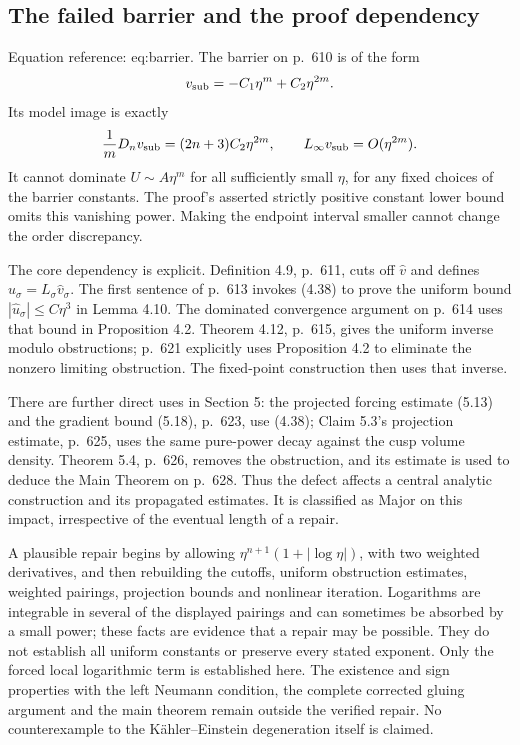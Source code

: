 \documentclass[10pt]{article}
\begin{document}
\subsection*{The failed barrier and the proof dependency}
Equation reference: eq:barrier. The barrier on p. 610 is of the form \[v_{\rm sub}=-C_1\eta^m+C_2\eta^{2m}.\] Its model image is exactly \[\frac1mD_nv_{\rm sub}=(2n+3)C_2\eta^{2m},
 \qquad L_\infty v_{\rm sub}=O(\eta^{2m}).
 \] It cannot dominate \(U\sim A\eta^m\) for all sufficiently small \(\eta\), for any fixed choices of the barrier constants. The proof’s asserted strictly positive constant lower bound omits this vanishing power. Making the endpoint interval smaller cannot change the order discrepancy.\par
The core dependency is explicit. Definition 4.9, p. 611, cuts off \(\widehat v\) and defines \(\widehat u_\sigma=L_\sigma\widehat v_\sigma\). The first sentence of p. 613 invokes (4.38) to prove the uniform bound \(|\widehat u_\sigma|\leq C\eta^3\) in Lemma 4.10. The dominated convergence argument on p. 614 uses that bound in Proposition 4.2. Theorem 4.12, p. 615, gives the uniform inverse modulo obstructions; p. 621 explicitly uses Proposition 4.2 to eliminate the nonzero limiting obstruction. The fixed-point construction then uses that inverse.\par
There are further direct uses in Section 5: the projected forcing estimate (5.13) and the gradient bound (5.18), p. 623, use (4.38); Claim 5.3’s projection estimate, p. 625, uses the same pure-power decay against the cusp volume density. Theorem 5.4, p. 626, removes the obstruction, and its estimate is used to deduce the Main Theorem on p. 628. Thus the defect affects a central analytic construction and its propagated estimates. It is classified as Major on this impact, irrespective of the eventual length of a repair.\par
A plausible repair begins by allowing \(\eta^{n+1}(1+|\log\eta|)\), with two weighted derivatives, and then rebuilding the cutoffs, uniform obstruction estimates, weighted pairings, projection bounds and nonlinear iteration. Logarithms are integrable in several of the displayed pairings and can sometimes be absorbed by a small power; these facts are evidence that a repair may be possible. They do not establish all uniform constants or preserve every stated exponent. Only the forced local logarithmic term is established here. The existence and sign properties with the left Neumann condition, the complete corrected gluing argument and the main theorem remain outside the verified repair. No counterexample to the Kähler–Einstein degeneration itself is claimed.\par
\end{document}
